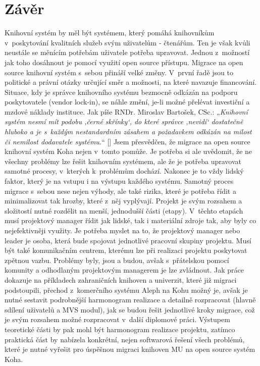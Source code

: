 \documentclass[
	11pt, oneside, printed, final, palatino, monochrome
	microtype,
	table,   %
	lof,     %
	lot     %
]{fithesis3}
\makeatletter
\newcommand{\citepages}[2]{[\cite[#1]{#2}]}
\newcommand{\citace}[1]{„\textit{#1}“} %
\makeatother
\begin{document}
{\chapter*{Závěr}
Knihovní systém by měl být systémem, který pomáhá knihovníkům v~poskytování kvalitních služeb svým uživatelům - čtenářům. Ten je však kvůli neustále se měnícím potřebám uživatele potřeba upravovat. Jednou z~možností jak toho dosáhnout je pomocí využití open source přístupu. Migrace na open source knihovní systém s~sebou přináší velké změny. V~první řadě jsou to politické a právní otázky určující směr a možnosti, na které navazuje financování. Situace, kdy je správce knihovního systému bezmocně odkázán na podporu poskytovatele (vendor lock-in), se náhle změní, je-li možné přelévat investiční a mzdové náklady instituce. Jak píše RNDr. Miroslav Bartošek, CSc.: \citace{Knihovní systém nesmí mít podobu ‚černé skřínky‘, do které správce ‚nevidí‘ dostatečně hluboko a je s~každým nestandardním zásahem a požadavkem odkázán na milost či nemilost dodavatele systému.} \citepages{3}{bartosek_2001_systemovy_pohled}
 Jsem přesvědčen, že migrace na open source knihovní systém Koha nejen v~tomto pomůže. Je potřeba si ale uvědomit, že ne všechny problémy lze řešit knihovním systémem, ale že je potřeba upravovat samotné procesy, v~kterých k~problémům dochází. Nakonec je to vždy lidský faktor, který je na vstupu i na výstupu každého systému. Samotný proces migrace s~sebou nese nejen výhody, ale také rizika, které je potřeba řídit a minimalizovat tak hrozby, které z~něj vyplývají. Projekt je svým rozsahem a složitostí nutné rozdělit na menší, jednodušší části (etapy). V~těchto etapách musí projektový manager řídit jak lidské, tak i materiální zdroje tak, aby byly co nejefektivněji využity. Je potřeba myslet na to, že projektový manager nebo leader je osoba, která bude spojovat jednotlivé pracovní skupiny projektu. Musí být také komunikačním centrem, kterému lze při realizaci projektu poskytovat zpětnou vazbu.  Problémy byly, jsou a budou, avšak s~přátelskou pomocí komunity a odhodlaným projektovým managerem je lze zvládnout. Jak práce dokazuje na příkladech zahraničních knihoven a univerzit, které již migraci podstoupili, přechod z~komerčního systému Aleph na Kohu možný je, avšak je nutné sestavit podrobnější harmonogram realizace a detailně rozpracovat (hlavně sdílení uživatelů a MVS modul), jak se budou řešit jednotlivé kroky migrace, což je svým rozsahem možné rozpracovat v~další diplomové práci. Výstupem teoretické části by pak mohl být harmonogram realizace projektu, zatímco praktická část by nabízela konkrétní, nejen softwarová řešení všech problémů, které je nutné vyřešit pro úspěšnou migraci knihoven MU na open source systém Koha.

}
\end{document}
